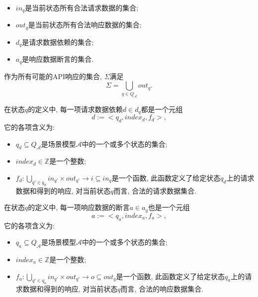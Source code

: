 \begin{definition}
\begin{itemize}
                \item $in_q$是当前状态所有合法请求数据的集合;
                
                \item $out_q$是当前状态所有合法响应数据的集合;
                
                \item $d_q$是请求数据依赖的集合;
                
                \item $a_q$是响应数据断言的集合.
            \end{itemize}
            
            作为所有可能的API响应的集合, $\Sigma$满足
            \begin{equation}
                \Sigma = \bigcup_{q \in Q_{\mathcal{A}}} out_q.
            \end{equation}
            
            在状态$q$的定义中, 每一项请求数据依赖$d \in d_q$都是一个元组
            \begin{equation}
                d := <q_d, index_d, f_d>,
            \end{equation}
            它的各项含义为:
            \begin{itemize}
                \item $q_d \subseteq Q_{\mathcal{A}}$是场景模型$\mathcal{A}$中的一个或多个状态的集合;
                
                \item $index_d \in \mathbb{Z}$是一个整数;
                
                \item $f_d: \bigcup_{q' \in q_d} in_{q'} \times out_{q'} \to i \subseteq in_q$是一个函数, 此函数定义了给定状态$q_d$上的请求数据和得到的响应, 对当前状态$q$而言, 合法的请求数据集合.
            \end{itemize}
            
            在状态$q$的定义中, 每一项响应数据的断言$a \in a_q$也是一个元组
            \begin{equation}
                a := <q_a, index_a, f_a>,
            \end{equation}
            它的各项含义为:
            \begin{itemize}
                \item $q_a \subseteq Q_{\mathcal{A}}$是场景模型$\mathcal{A}$中的一个或多个状态的集合;
                
                \item $index_a \in \mathbb{Z}$是一个整数;
                
                \item $f_a: \bigcup_{q' \in q_a} in_{q'} \times out_{q'} \to o \subseteq out_q$是一个函数, 此函数定义了给定状态$q_a$上的请求数据和得到的响应, 对当前状态$q$而言, 合法的响应数据集合.
            \end{itemize}
        \end{definition}
        
